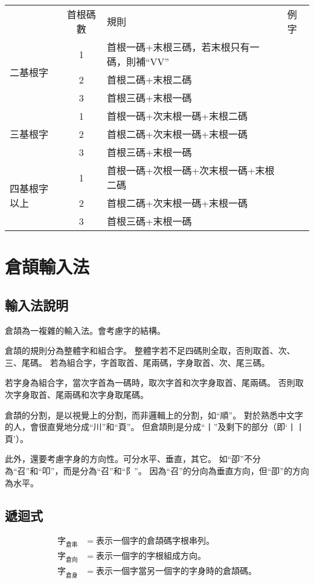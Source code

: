 \documentclass{article}
\begin{document}
\begin{tabular}{lcll}
           & 首根碼數 & 規則 & 例字\\
  \multirow{3}{*}{二基根字} & 1 & 首根一碼+末根三碼，若末根只有一碼，則補``VV''\\
  & 2 & 首根二碼+末根二碼\\
  & 3 & 首根三碼+末根一碼\\
  \multirow{3}{*}{三基根字} & 1 & 首根一碼+次末根一碼+末根二碼\\
  & 2 & 首根二碼+次末根一碼+末根一碼\\
  & 3 & 首根三碼+末根一碼\\
  \multirow{4}{*}{四基根字以上} & 1 & 首根一碼+次根一碼+次末根一碼+末根二碼\\
  & 2 & 首根二碼+次末根一碼+末根一碼\\
  & 3 & 首根三碼+末根一碼\\
\end{tabular}

\section{倉頡輸入法}
\subsection{輸入法說明}
倉頡為一複雜的輸入法。會考慮字的結構。

倉頡的規則分為整體字和組合字。
整體字若不足四碼則全取，否則取首、次、三、尾碼。
若為組合字，字首取首、尾兩碼，字身取首、次、尾三碼。

若字身為組合字，當次字首為一碼時，取次字首和次字身取首、尾兩碼。
否則取次字身取首、尾兩碼和次字身取尾碼。

倉頡的分割，是以視覺上的分割，而非邏輯上的分割，如``順''。
對於熟悉中文字的人，會很直覺地分成``川''和``頁''。
但倉頡則是分成``丨''及剩下的部分（即`丨丨頁'）。

此外，還要考慮字身的方向性。可分水平、垂直，其它。
如``卲''不分為``召''和``叩''，而是分為``召''和``阝''。
因為``召''的分向為垂直方向，但``卲''的方向為水平。

\subsection{遞迴式}
\begin{subequations}
  \begin{align}
    \mbox{字}_{\mbox{倉串}} &= 表示一個字的倉頡碼字根串列。\\
    \mbox{字}_{\mbox{倉向}} &= 表示一個字的字根組成方向。\\
    \mbox{字}_{\mbox{倉身}} &= 表示一個字當另一個字的字身時的倉頡碼。\\
  \end{align}
\end{subequations}
\end{document}
